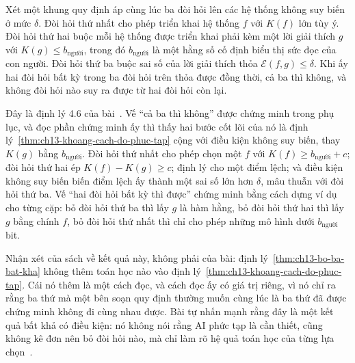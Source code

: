 \begin{theorem}
\label{thm:ch13-bo-ba-bat-kha}
Xét một khung quy định áp cùng lúc ba đòi hỏi lên các hệ thống không suy biến ở
mức $\delta$. Đòi hỏi thứ nhất cho phép triển khai hệ thống $f$ với $K(f)$ lớn
tùy ý. Đòi hỏi thứ hai buộc mỗi hệ thống được triển khai phải kèm một lời giải
thích $g$ với $K(g) \le b_{\text{người}}$, trong đó $b_{\text{người}}$ là một
hằng số cố định biểu thị sức đọc của con người. Đòi hỏi thứ ba buộc sai số của
lời giải thích thỏa $\mathcal{E}(f,g) \le \delta$. Khi ấy hai đòi hỏi bất kỳ
trong ba đòi hỏi trên thỏa được đồng thời, cả ba thì không, và không đòi hỏi nào
suy ra được từ hai đòi hỏi còn lại.
\end{theorem}

Đây là định lý 4.6 của bài~\autocite{p26limits}. Vế \enquote{cả ba thì không}
được chứng minh trong phụ lục, và đọc phần chứng minh ấy thì thấy hai bước cốt
lõi của nó là định lý~\ref{thm:ch13-khoang-cach-do-phuc-tap} cộng với điều kiện
không suy biến, thay $K(g)$ bằng $b_{\text{người}}$. Đòi hỏi thứ nhất cho phép
chọn một $f$ với $K(f) \ge b_{\text{người}} + c$; đòi hỏi thứ hai ép
$K(f) - K(g) \ge c$; định lý cho một điểm lệch; và điều kiện không suy biến biến
điểm lệch ấy thành một sai số lớn hơn $\delta$, mâu thuẫn với đòi hỏi thứ ba.
Vế \enquote{hai đòi hỏi bất kỳ thì được} chứng minh bằng cách dựng ví dụ cho
từng cặp: bỏ đòi hỏi thứ ba thì lấy $g$ là hàm hằng, bỏ đòi hỏi thứ hai thì lấy
$g$ bằng chính $f$, bỏ đòi hỏi thứ nhất thì chỉ cho phép những mô hình dưới
$b_{\text{người}}$ bit.

Nhận xét của sách về kết quả này, không phải của bài: định
lý~\ref{thm:ch13-bo-ba-bat-kha} không thêm toán học nào vào định
lý~\ref{thm:ch13-khoang-cach-do-phuc-tap}. Cái nó thêm là một cách đọc, và cách
đọc ấy có giá trị riêng, vì nó chỉ ra rằng ba thứ mà một bên soạn quy định
thường muốn cùng lúc là ba thứ đã được chứng minh không đi cùng nhau được. Bài
tự nhấn mạnh rằng đây là một kết quả bất khả có điều kiện: nó không nói rằng AI
phức tạp là cần thiết, cũng không kê đơn nên bỏ đòi hỏi nào, mà chỉ làm rõ hệ
quả toán học của từng lựa chọn~\autocite{p26limits}.

%
%
